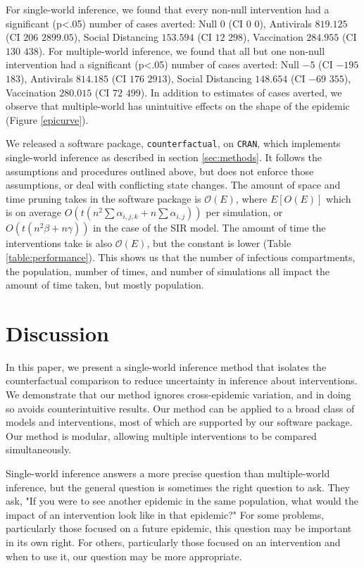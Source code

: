 \documentclass[openacc]{rsproca_new}%
\begin{document}
For single-world inference, we found that every non-null intervention had a significant (p<.05) number of cases averted: Null $ 0 $ (CI $ 0 $ \textemdash $ 0 $), Antivirals $ 819.125 $ (CI $ 206 $ \textemdash $ 2899.05 $), Social Distancing $ 153.594 $ (CI $ 12 $ \textemdash $ 298 $), Vaccination $ 284.955 $ (CI $ 130 $ \textemdash $ 438 $).
For multiple-world inference, we found that all but one non-null intervention had a significant (p<.05) number of cases averted: Null $ -5 $ (CI $ -195 $ \textemdash $ 183 $), Antivirals $ 814.185 $ (CI $ 176 $ \textemdash $ 2913 $), Social Distancing $ 148.654 $ (CI $ -69 $ \textemdash $ 355 $), Vaccination $ 280.015 $ (CI $ 72 $ \textemdash $ 499 $).
In addition to estimates of cases averted, we observe that multiple-world has unintuitive effects on the shape of the epidemic (Figure \ref{epicurve}).

We released a software package, \texttt{counterfactual}, on \texttt{CRAN}, %
which implements single-world inference as described in section \ref{sec:methods}.
It follows the assumptions and procedures outlined above, but does not enforce those assumptions, or deal with conflicting state changes.
The amount of space and time pruning takes in the software package is $\mathcal O(E)$, where $E[O(E)]$ which is on average $O(t(n^2\sum \alpha_{i,j,k} + n \sum\alpha_{i,j}))$ per simulation, or $O(t(n^2\beta + n\gamma))$ in the case of the SIR model.
The amount of time the interventions take is also $\mathcal O(E)$, but the constant is lower (Table \ref{table:performance}).
This shows us that the number of infectious compartments, the population, number of times, and number of simulations all impact the amount of time taken, but mostly population.

\section{Discussion}
In this paper, we present a single-world inference method that isolates the counterfactual comparison to reduce uncertainty in inference about interventions.
We demonstrate that our method ignores cross-epidemic variation, and in doing so avoids counterintuitive results.
Our method can be applied to a broad class of models and interventions, most of which are supported by our software package.
Our method is modular, allowing multiple interventions to be compared simultaneously.

Single-world inference answers a more precise question than multiple-world inference, but the general question is sometimes the right question to ask.
They ask, "If you were to see another epidemic in the same population, what would the impact of an intervention look like in that epidemic?"
For some problems, particularly those focused on a future epidemic, this question may be important in its own right.
For others, particularly those focused on an intervention and when to use it, our question may be more appropriate.
\end{document}
